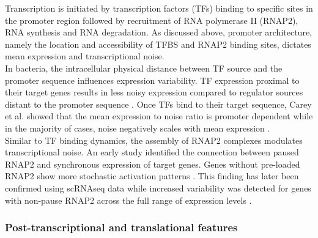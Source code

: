 Transcription is initiated by transcription factors (TFs) binding to specific sites in the promoter region followed by recruitment of RNA polymerase II (RNAP2), RNA synthesis and RNA degradation. As discussed above, promoter architecture, namely the location and accessibility of TFBS and RNAP2 binding sites, dictates mean expression and transcriptional noise. \\
In bacteria, the intracellular physical distance between TF source and the promoter sequence influences expression variability. TF expression proximal to their target genes results in less noisy expression compared to regulator sources distant to the promoter sequence \citep{Goni-Moreno2017}. Once TFs bind to their target sequence, Carey et al. showed that the mean expression to noise ratio is promoter dependent while in the majority of cases, noise negatively scales with mean expression \citep{Carey2013}.   \\
Similar to TF binding dynamics, the assembly of RNAP2 complexes modulates transcriptional noise. An early study identified the connection between paused RNAP2 and synchronous expression of target genes. Genes without pre-loaded RNAP2 show more stochastic activation patterns \citep{Boettiger2009}. This finding has later been confirmed using scRNAseq data while increased variability was detected for genes with non-pause RNAP2 across the full range of expression levels \citep{Day2016}. 

\subsubsection{Post-transcriptional and translational features}


